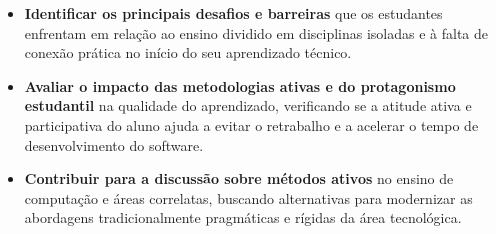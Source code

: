 \begin{itemize}
    \item \textbf{Identificar os principais desafios e barreiras} que os estudantes enfrentam em relação ao ensino dividido em disciplinas isoladas e à falta de conexão prática no início do seu aprendizado técnico.
    \item \textbf{Avaliar o impacto das metodologias ativas e do protagonismo estudantil} na qualidade do aprendizado, verificando se a atitude ativa e participativa do aluno ajuda a evitar o retrabalho e a acelerar o tempo de desenvolvimento do software.
    \item \textbf{Contribuir para a discussão sobre métodos ativos} no ensino de computação e áreas correlatas, buscando alternativas para modernizar as abordagens tradicionalmente pragmáticas e rígidas da área tecnológica.
\end{itemize}